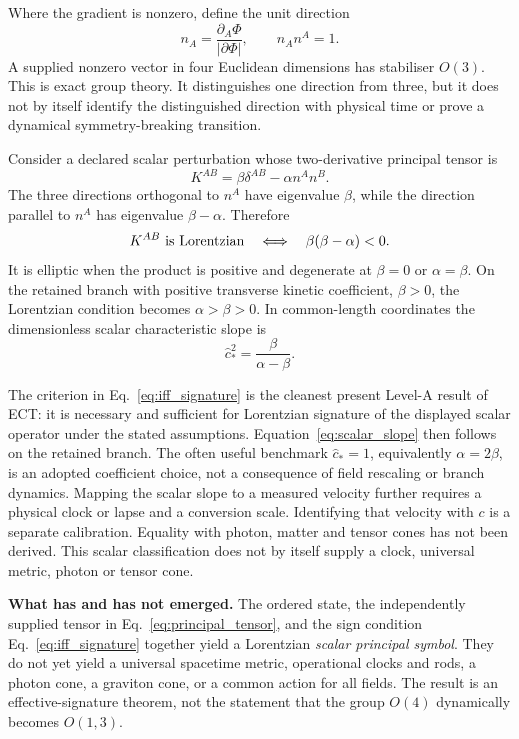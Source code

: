 \documentclass[11pt,a4paper]{article}
\begin{document}
Where the gradient is nonzero, define the unit direction
\begin{equation}
 n_A=\frac{\partial_A\Phi}{|\partial\Phi|},
 \qquad n_An^A=1 .
 \label{eq:director}
\end{equation}
A supplied nonzero vector in four Euclidean dimensions has stabiliser
$O(3)$.  This is exact group theory.  It distinguishes one direction from
three, but it does not by itself identify the distinguished direction with
physical time or prove a dynamical symmetry-breaking transition.

Consider a declared scalar perturbation whose two-derivative principal tensor
is
\begin{equation}
 K^{AB}=\beta\delta^{AB}-\alpha n^An^B .
 \label{eq:principal_tensor}
\end{equation}
The three directions orthogonal to $n^A$ have eigenvalue $\beta$, while the
direction parallel to $n^A$ has eigenvalue $\beta-\alpha$.  Therefore
\begin{equation}
 K^{AB}\ \hbox{is Lorentzian}
 \quad\Longleftrightarrow\quad
 \beta(\beta-\alpha)<0 .
 \label{eq:iff_signature}
\end{equation}
It is elliptic when the product is positive and degenerate at
$\beta=0$ or $\alpha=\beta$.  On the retained branch with positive
transverse kinetic coefficient, $\beta>0$, the Lorentzian condition becomes
$\alpha>\beta>0$.  In common-length coordinates the dimensionless scalar
characteristic slope is
\begin{equation}
 \widehat c_*^2=\frac{\beta}{\alpha-\beta} .
 \label{eq:scalar_slope}
\end{equation}

The criterion in Eq.~\eqref{eq:iff_signature} is the cleanest present
Level-A result of ECT: it is necessary and sufficient for Lorentzian signature
of the displayed scalar operator under the stated assumptions.
Equation~\eqref{eq:scalar_slope} then follows on the retained branch.  The often useful
benchmark $\widehat c_*=1$, equivalently $\alpha=2\beta$, is an adopted
coefficient choice, not a consequence of field rescaling or branch dynamics.
Mapping the scalar slope to a measured velocity further requires a physical
clock or lapse and a conversion scale.  Identifying that velocity with $c$ is
a separate calibration.  Equality with photon, matter and tensor cones has
not been derived.  This scalar classification does not by itself supply a
clock, universal metric, photon or tensor cone.

\begin{boundarybox}[breakable=false]
\textbf{What has and has not emerged.}
The ordered state, the independently supplied tensor in
Eq.~\eqref{eq:principal_tensor}, and the sign condition
Eq.~\eqref{eq:iff_signature} together yield a Lorentzian \emph{scalar principal
symbol}.  They do not yet yield a universal spacetime
metric, operational clocks and rods, a photon cone, a graviton cone, or a
common action for all fields.  The result is an effective-signature theorem,
not the statement that the group $O(4)$ dynamically becomes $O(1,3)$.
\end{boundarybox}
\end{document}
